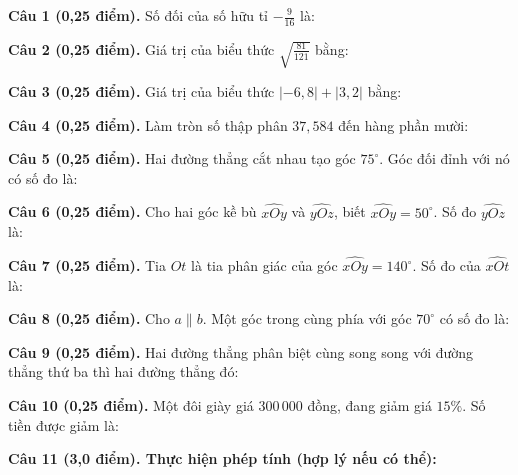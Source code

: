 \documentclass[12pt,a4paper]{article}
\begin{document}
\noindent\textbf{Câu 1 (0,25 điểm).} Số đối của số hữu tỉ $-\frac{9}{16}$ là: \par\vspace{2.4mm}
\noindent\textbf{Câu 2 (0,25 điểm).} Giá trị của biểu thức $\sqrt{\frac{81}{121}}$ bằng: \par\vspace{2.4mm}
\noindent\textbf{Câu 3 (0,25 điểm).} Giá trị của biểu thức $|-6{,}8| + |3{,}2|$ bằng: \par\vspace{2.4mm}
\noindent\textbf{Câu 4 (0,25 điểm).} Làm tròn số thập phân $37{,}584$ đến hàng phần mười: \par\vspace{2.4mm}
\noindent\textbf{Câu 5 (0,25 điểm).} Hai đường thẳng cắt nhau tạo góc $75^\circ$. Góc đối đỉnh với nó có số đo là: \par\vspace{2.4mm}
\noindent\textbf{Câu 6 (0,25 điểm).} Cho hai góc kề bù $\widehat{xOy}$ và $\widehat{yOz}$, biết $\widehat{xOy} = 50^\circ$. Số đo $\widehat{yOz}$ là: \par\vspace{2.4mm}
\noindent\textbf{Câu 7 (0,25 điểm).} Tia $Ot$ là tia phân giác của góc $\widehat{xOy} = 140^\circ$. Số đo của $\widehat{xOt}$ là: \par\vspace{2.4mm}
\noindent\textbf{Câu 8 (0,25 điểm).} Cho $a \parallel b$. Một góc trong cùng phía với góc $70^\circ$ có số đo là: \par\vspace{2.4mm}
\noindent\textbf{Câu 9 (0,25 điểm).} Hai đường thẳng phân biệt cùng song song với đường thẳng thứ ba thì hai đường thẳng đó: \par\vspace{2.4mm}
\noindent\textbf{Câu 10 (0,25 điểm).} Một đôi giày giá $300\,000$ đồng, đang giảm giá $15\%$. Số tiền được giảm là: \par\vspace{2.4mm}
\vspace{0.4mm}

\noindent\textbf{Câu 11 (3,0 điểm). Thực hiện phép tính (hợp lý nếu có thể):}
\vspace{0.8mm}
\end{document}
